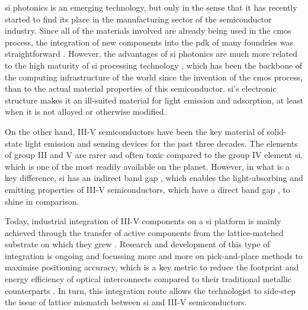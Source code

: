 \Acl{si} photonics is an emerging technology, but only in the sense that it has recently started to find its place in the manufacturing sector of the semiconductor industry. Since all of the materials involved are already being used in the \acs{cmos} process, the integration of new components into the \acf{pdk} of many foundries was straightforward \cite{Shi2022, Siew2021, Novack2014}. However, the advantages of \acl{si} photonics are much more related to the high maturity of \acl{si} processing technology \cite{Novack2014}, which has been the backbone of the computing infrastructure of the world since the invention of the \acs{cmos} process, than to the actual material properties of this semiconductor. \Acl{si}'s electronic structure makes it an ill-suited material for light emission and adsorption, at least when it is not alloyed or otherwise modified.

On the other hand, III-V semiconductors have been the key material of solid-state light emission \cite{Schlereth1996, Nakamura1994} and sensing \cite{Ting2019, Liang2022} devices for the past three decades. The elements of group III and V are rarer and often toxic compared to the group IV element \acl{si}, which is one of the most readily available on the planet. However, in what is a key difference, \acl{si} has an indirect band gap \cite{Chelikowsky1974}, which enables the light-absorbing and emitting properties of III-V semiconductors, which have a direct band gap \cite{Khanin2005}, to shine in comparison.

Today, industrial integration of III-V components on a \acl{si} platform is mainly achieved through the transfer of active components from the lattice-matched substrate on which they grew \cite{Han2022}. Research and development of this type of integration is ongoing and focussing more and more on pick-and-place methods \cite{McPhillimy2020} to maximise positioning accuracy, which is a key metric to reduce the footprint and energy efficiency of optical interconnects compared to their traditional metallic counterparts \cite{Miller2000, Miller2009}. In turn, this integration route allows the technologist to side-step the issue of lattice mismatch between \acl{si} and III-V semiconductors.


